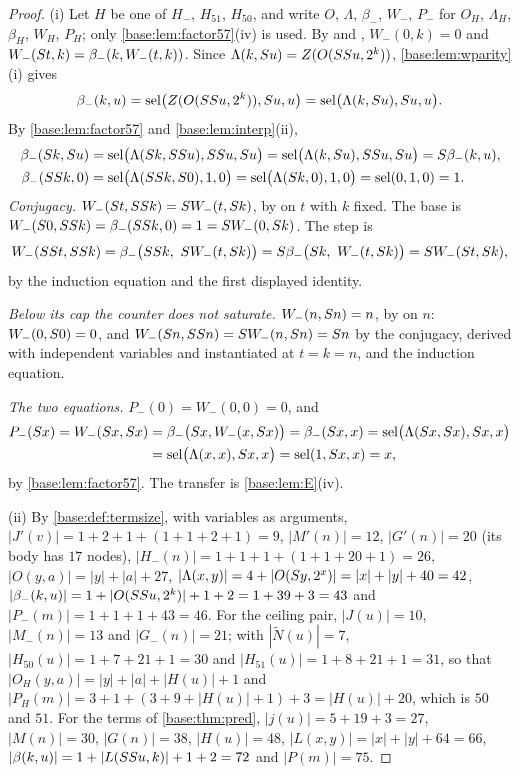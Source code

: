 \begin{proof}
(i) Let $H$ be one of $H_-$, $H_{51}$, $H_{50}$, and write $O$, $\Lambda$,
$\beta_-$, $W_-$, $P_-$ for $O_H$, $\Lambda_H$, $\beta_H$, $W_H$, $P_H$; only
\cref{base:lem:factor57}(iv) is used.  By  and ,
$W_-(0,k)=0$ and $W_-(S t,k)=\beta_-(k,W_-(t,k))$.  Since
$\Lambda(k,S u)=Z(O(SS u,2^{k}))$,
\cref{base:lem:wparity}(i) gives
\[
 \beta_-(k,u)=\operatorname{sel}\bigl(Z(O(SS u,2^{k})),S u,u\bigr)
 =\operatorname{sel}\bigl(\Lambda(k,S u),S u,u\bigr).
\]
By \cref{base:lem:factor57} and \cref{base:lem:interp}(ii),
\begin{align*}
 \beta_-(S k,S u)
 &=\operatorname{sel}\bigl(\Lambda(S k,SS u),SS u,S u\bigr)
  =\operatorname{sel}\bigl(\Lambda(k,S u),SS u,S u\bigr)=S\beta_-(k,u),\\
 \beta_-(SS k,0)
 &=\operatorname{sel}\bigl(\Lambda(SS k,S 0),1,0\bigr)
  =\operatorname{sel}\bigl(\Lambda(S k,0),1,0\bigr)=\operatorname{sel}(0,1,0)=1.
\end{align*}
\emph{Conjugacy.}  $W_-(S t,SS k)=S W_-(t,S k)$, by
 on $t$ with $k$ fixed.  The base is
$W_-(S 0,SS k)=\beta_-(SS k,0)=1=S W_-(0,S k)$.  The
step is
\[
 W_-(SS t,SS k)
 =\beta_-\bigl(SS k,\ S W_-(t,S k)\bigr)
 =S\beta_-\bigl(S k,\ W_-(t,S k)\bigr)=S W_-(S t,S k),
\]
by the induction equation and the first displayed identity.

\emph{Below its cap the counter does not saturate.}  $W_-(n,S n)=n$, by
 on $n$: $W_-(0,S 0)=0$, and
$W_-(S n,SS n)=S W_-(n,S n)=S n$ by the conjugacy,
derived with independent variables and instantiated at $t=k=n$, and the
induction equation.

\emph{The two equations.}  $P_-(0)=W_-(0,0)=0$, and
\begin{align*}
 P_-(S x)=W_-(S x,S x)
 &=\beta_-\bigl(S x,W_-(x,S x)\bigr)=\beta_-(S x,x)
  =\operatorname{sel}\bigl(\Lambda(S x,S x),S x,x\bigr)\\
 &=\operatorname{sel}\bigl(\Lambda(x,x),S x,x\bigr)=\operatorname{sel}(1,S x,x)=x,
\end{align*}
by \cref{base:lem:factor57}.  The transfer is \cref{base:lem:E}(iv).

(ii) By \cref{base:def:termsize}, with variables as arguments,
$|J'(v)|=1+2+1+(1+1+2+1)=9$, $|M'(n)|=12$, $|G'(n)|=20$ (its body has $17$
nodes), $|H_-(n)|=1+1+1+(1+1+20+1)=26$, $|O(y,a)|=|y|+|a|+27$,
$|\Lambda(x,y)|=4+|O(S y,2^{x})|=|x|+|y|+40=42$,
$|\beta_-(k,u)|=1+|O(SS u,2^{k})|+1+2=1+39+3=43$ and
$|P_-(m)|=1+1+1+43=46$.  For the ceiling pair, $|J(u)|=10$, $|M_-(n)|=13$
and $|G_-(n)|=21$; with $|\tilde N(u)|=7$, $|H_{50}(u)|=1+7+21+1=30$ and
$|H_{51}(u)|=1+8+21+1=31$, so that $|O_H(y,a)|=|y|+|a|+|H(u)|+1$ and
$|P_H(m)|=3+1+(3+9+|H(u)|+1)+3=|H(u)|+20$, which is $50$ and $51$.  For the
terms of \cref{base:thm:pred}, $|j(u)|=5+19+3=27$, $|M(n)|=30$, $|G(n)|=38$,
$|H(u)|=48$, $|L(x,y)|=|x|+|y|+64=66$,
$|\beta(k,u)|=1+|L(SS u,k)|+1+2=72$ and $|P(m)|=75$.
\end{proof}

